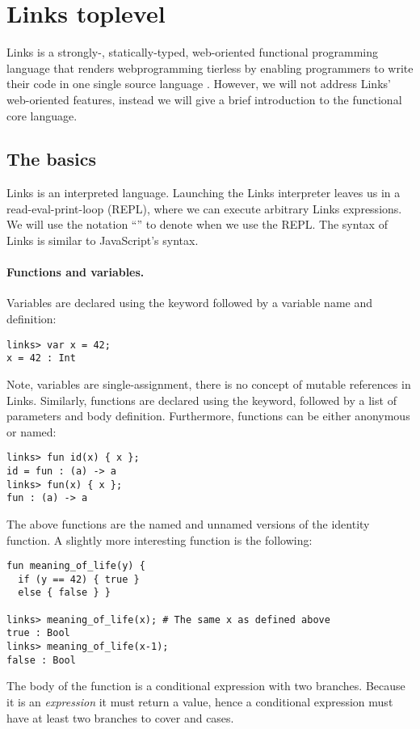 \section{Links toplevel}
Links is a strongly-, statically-typed, web-oriented functional programming language that renders webprogramming tierless by enabling programmers to write their code in one single source language \cite{Cooper2006,Links}. However, we will not address Links' web-oriented features, instead we will give a brief introduction to the functional core language.

\subsection{The basics}
Links is an interpreted language. Launching the Links interpreter leaves us in a read-eval-print-loop (REPL), where we can execute arbitrary Links expressions. We will use the notation ``'' to denote when we use the REPL. The syntax of Links is similar to JavaScript's syntax.

\paragraph{Functions and variables.}
Variables are declared using the  keyword followed by a variable name and definition:
\begin{lstlisting}[style=links]
links> var x = 42;
x = 42 : Int
\end{lstlisting}
Note, variables are single-assignment, there is no concept of mutable references in Links.
Similarly, functions are declared using the  keyword, followed by a list of parameters and body definition. Furthermore, functions can be either anonymous or named:
\begin{lstlisting}[style=links]
links> fun id(x) { x };
id = fun : (a) -> a
links> fun(x) { x };
fun : (a) -> a
\end{lstlisting}
The above functions are the named and unnamed versions of the identity function. A slightly more interesting function is the following:
\begin{lstlisting}[style=links]
fun meaning_of_life(y) {
  if (y == 42) { true }
  else { false } }

links> meaning_of_life(x); # The same x as defined above
true : Bool
links> meaning_of_life(x-1);
false : Bool
\end{lstlisting}
The body of the function  is a conditional expression with two branches. Because it is an \emph{expression} it must return a value, hence a conditional expression must  have at least two branches to cover  and  cases.

